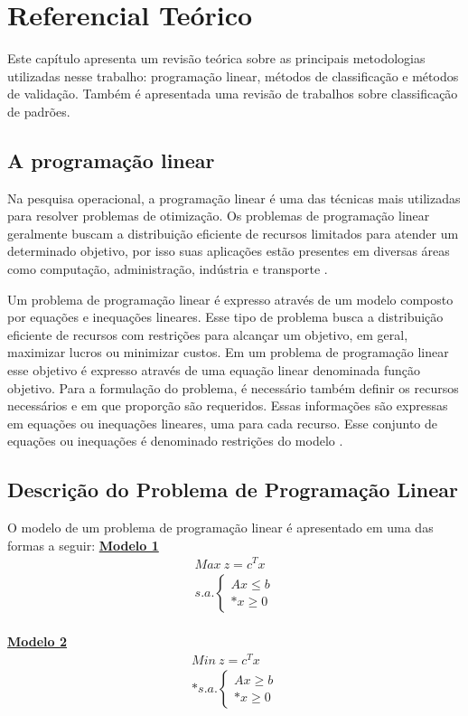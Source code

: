 \chapter{Referencial Teórico}
Este capítulo apresenta um revisão teórica sobre as principais metodologias utilizadas nesse trabalho: programação linear, métodos de classificação e métodos de validação. Também é apresentada uma revisão de trabalhos sobre classificação de padrões.  

\section{A programação linear}
Na pesquisa operacional, a programação linear é uma das técnicas mais utilizadas para resolver problemas de otimização. Os problemas de programação linear geralmente buscam a distribuição eficiente de recursos limitados para atender um determinado objetivo, por isso suas aplicações estão presentes em diversas áreas como computação, administração, indústria e transporte \cite{Engecom}.

Um problema de programação linear é expresso através de um modelo composto por equações e inequações lineares. Esse tipo de problema busca a distribuição eficiente de recursos com restrições para alcançar um objetivo, em geral, maximizar lucros ou minimizar custos. Em um problema de programação linear esse objetivo é expresso através de uma equação linear denominada função objetivo. Para a formulação do problema, é necessário também definir os recursos necessários e em que proporção são requeridos. Essas informações são expressas em equações ou inequações lineares, uma para cada recurso. Esse conjunto de equações ou inequações é denominado restrições do modelo \cite{Engecom}.

\section{Descrição do Problema de Programação Linear}
O modelo de um problema de programação linear é apresentado em uma das formas a seguir:
\newpage
\noindent
\underline{\bf Modelo 1}
\begin{eqnarray}
    Max\ z = c^{T}x \label{eq:obj1}
\\s.a.\left\{\begin{matrix}
Ax\leq b\\*x\geq 0
\end{matrix}\right.\label{eq:rest1}
\end{eqnarray}
\\
\noindent
\underline{\bf Modelo 2}
\begin{eqnarray}
Min\ z = c^{T}x \label{eq:obj2}
\\*s.a.\left\{\begin{matrix}
Ax\geq  b\\*x\geq 0 
\end{matrix}\right. \label{eq:rest2}
\end{eqnarray}

